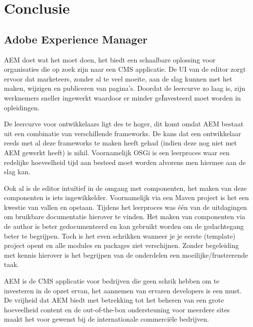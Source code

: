\documentclass{article}
\begin{document}
	\section{Conclusie}
    \subsection{Adobe Experience Manager}
    AEM doet wat het moet doen, het biedt een schaalbare oplossing voor organisaties die op zoek zijn naar een CMS applicatie. 
    De UI van de editor zorgt ervoor dat marketeers, zonder al te veel moeite, aan de slag kunnen met het maken, wijzigen en publiceren van pagina's. 
    Doordat de leercurve zo laag is, zijn werknemers sneller ingewerkt waardoor er minder ge\"Investeerd moet worden in opleidingen.
    \par
    De leercurve voor ontwikkelaars ligt des te hoger, dit komt omdat AEM bestaat uit een combinatie van verschillende frameworks. 
    De kans dat een ontwikkelaar reeds met al deze frameworks te maken heeft gehad (indien deze nog niet met AEM gewerkt heeft) is nihil.
    Voornamelijk OSGi is een leerproces waar een redelijke hoeveelheid tijd aan besteed moet worden alvorens men hiermee aan de slag kan.
    \par
    Ook al is de editor intu\"itief in de omgang met componenten, het maken van deze componenten is iets ingewikkelder. Voornamelijk via een Maven project
    is het een kwestie van vallen en opstaan. Tijdens het leerproces was \'e\'en van de uitdagingen om bruikbare documentatie hierover te vinden. 
    Het maken van componenten via de author is beter gedocumenteerd en kan gebruikt worden om de gedachtegang beter te begrijpen. 
    Toch is het even schrikken wanneer je je eerste (template) project opent en alle modules en packages ziet verschijnen.
    Zonder begeleiding met kennis hierover is het begrijpen van de onderdelen een moeilijke/frustrerende taak.
    \par
    AEM is de CMS applicatie voor bedrijven die geen schrik hebben om te investeren in de opzet ervan, het aannemen van ervaren developers is een must.
    De vrijheid dat AEM biedt met betrekking tot het beheren van een grote hoeveelheid content en de out-of-the-box ondersteuning voor meerdere sites maakt
    het voor gewenst bij de internationale commerci\"ele bedrijven. 
\end{document}
